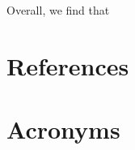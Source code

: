 \documentclass[DM,authoryear,toc]{lsstdoc}
\begin{document}
Overall, we find that 


\appendix
\section{References} \label{sec:bib}


\section{Acronyms} \label{sec:acronyms}

\end{document}
